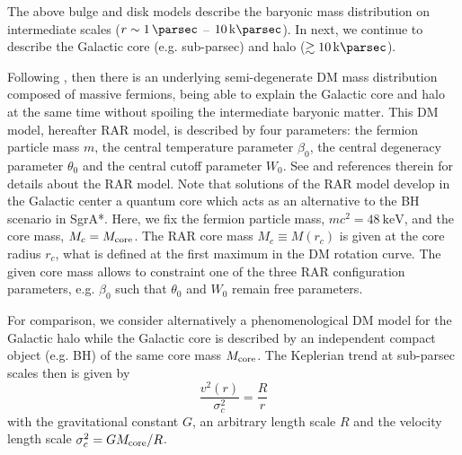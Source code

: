 The above bulge and disk models describe the baryonic mass distribution on intermediate scales ($r \sim \SI{1}{\parsec}$ -- $\SI{10}{\kilo\parsec}$). In next, we continue to describe the Galactic core (e.g. sub-parsec) and halo ($\gtrsim\SI{10}{\kilo\parsec}$).

Following \citet{2016arXiv160607040A}, then there is an underlying semi-degenerate DM mass distribution composed of massive fermions, being able to explain the Galactic core and halo at the same time without spoiling the intermediate baryonic matter. This DM model, hereafter RAR model, is described by four parameters: the fermion particle mass $m$, the central temperature parameter $\beta_0$, the central degeneracy parameter $\theta_0$ and the central cutoff parameter $W_0$. See \citet{2015MNRAS.451..622R,2016arXiv160607040A} and references therein for details about the RAR model. Note that solutions of the RAR model develop in the Galactic center a quantum core which acts as an alternative to the BH scenario in SgrA*. Here, we fix the fermion particle mass, $mc^2 = \SI{48}{\kilo\electronvolt}$, and the core mass, $M_c = M_{\rm core}$. The RAR core mass $M_c \equiv M(r_c)$ is given at the core radius $r_c$, what is defined at the first maximum in the DM rotation curve. The given core mass allows to constraint one of the three RAR configuration parameters, e.g. $\beta_0$ such that $\theta_0$ and $W_0$ remain free parameters.


For comparison, we consider alternatively a phenomenological DM model for the Galactic halo while the Galactic core is described by an independent compact object (e.g. BH) of the same core mass $M_{\rm core}$. The Keplerian trend at sub-parsec scales then is given by \begin{equation}
	\frac{v^2(r)}{\sigma_c^2} = \frac{R}{r}
\end{equation} with the gravitational constant $G$, an arbitrary length scale $R$ and the velocity length scale $\sigma_c^2 = G M_{\rm core}/R$.


